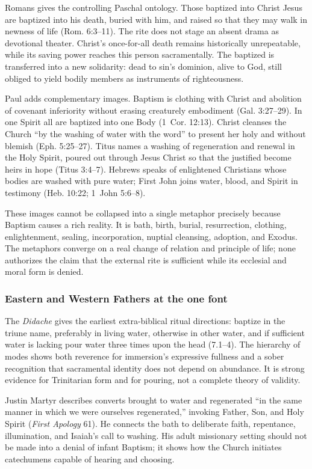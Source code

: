 Romans gives the controlling Paschal ontology. Those baptized into Christ Jesus are baptized into his death, buried with him, and raised so that they may walk in newness of life (Rom. 6:3--11). The rite does not stage an absent drama as devotional theater. Christ's once-for-all death remains historically unrepeatable, while its saving power reaches this person sacramentally. The baptized is transferred into a new solidarity: dead to sin's dominion, alive to God, still obliged to yield bodily members as instruments of righteousness.

Paul adds complementary images. Baptism is clothing with Christ and abolition of covenant inferiority without erasing creaturely embodiment (Gal. 3:27--29). In one Spirit all are baptized into one Body (1~Cor. 12:13). Christ cleanses the Church ``by the washing of water with the word'' to present her holy and without blemish (Eph. 5:25--27). Titus names a washing of regeneration and renewal in the Holy Spirit, poured out through Jesus Christ so that the justified become heirs in hope (Titus 3:4--7). Hebrews speaks of enlightened Christians whose bodies are washed with pure water; First John joins water, blood, and Spirit in testimony (Heb. 10:22; 1~John 5:6--8).

These images cannot be collapsed into a single metaphor precisely because Baptism causes a rich reality. It is bath, birth, burial, resurrection, clothing, enlightenment, sealing, incorporation, nuptial cleansing, adoption, and Exodus. The metaphors converge on a real change of relation and principle of life; none authorizes the claim that the external rite is sufficient while its ecclesial and moral form is denied.

\subsubsection{Eastern and Western Fathers at the one font}

The \emph{Didache} gives the earliest extra-biblical ritual directions: baptize in the triune name, preferably in living water, otherwise in other water, and if sufficient water is lacking pour water three times upon the head (7.1--4). The hierarchy of modes shows both reverence for immersion's expressive fullness and a sober recognition that sacramental identity does not depend on abundance. It is strong evidence for Trinitarian form and for pouring, not a complete theory of validity.

Justin Martyr describes converts brought to water and regenerated ``in the same manner in which we were ourselves regenerated,'' invoking Father, Son, and Holy Spirit (\emph{First Apology} 61). He connects the bath to deliberate faith, repentance, illumination, and Isaiah's call to washing. His adult missionary setting should not be made into a denial of infant Baptism; it shows how the Church initiates catechumens capable of hearing and choosing.

